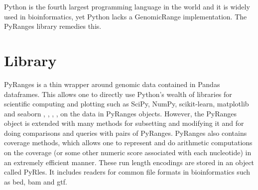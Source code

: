 \documentclass[10pt,letterpaper]{article}
\begin{document}
Python is the fourth largest programming language in the world and it is widely
used in bioinformatics, yet Python lacks a GenomicRange implementation. The
PyRanges library remedies this.

\section*{Library}

PyRanges is a thin wrapper around genomic data contained in Pandas
\cite{mckinney-proc-scipy-2010} dataframes. This allows one to directly use
Python's wealth of libraries for scientific computing and plotting such as
SciPy, NumPy, scikit-learn, matplotlib and seaborn \cite{scipy},
\cite{oliphant-2006-guide}, \cite{scikit-learn}, \cite{Hunter:2007},
\cite{michael_waskom_2017_883859} on the data in PyRanges objects. However, the
PyRanges object is extended with many methods for subsetting and modifying it
and for doing comparisons and queries with pairs of PyRanges. PyRanges also
contains coverage methods, which allows one to represent and do arithmetic
computations on the coverage (or some other numeric score associated with each
nucleotide) in an extremely efficient manner. These run length encodings are
stored in an object called PyRles. It includes readers for common
file formats in bioinformatics such as bed, bam and gtf.
\end{document}
